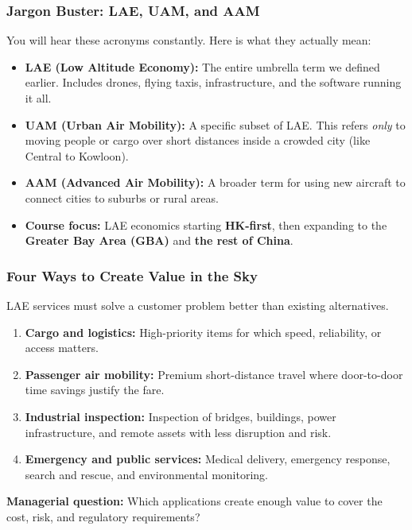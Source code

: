 \documentclass{beamer}
\begin{document}
\begin{frame}[t]
  \frametitle{Jargon Buster: LAE, UAM, and AAM}

  You will hear these acronyms constantly. Here is what they actually mean:

  \begin{itemize}
    \item \textbf{LAE (Low Altitude Economy):} The entire umbrella term we defined earlier. Includes drones, flying taxis, infrastructure, and the software running it all.
    \item \textbf{UAM (Urban Air Mobility):} A specific subset of LAE. This refers \textit{only} to moving people or cargo over short distances inside a crowded city (like Central to Kowloon).
    \item \textbf{AAM (Advanced Air Mobility):} A broader term for using new aircraft to connect cities to suburbs or rural areas.
    \item \textbf{Course focus:} LAE economics starting \textbf{HK-first}, then expanding to the \textbf{Greater Bay Area (GBA)} and \textbf{the rest of China}.
  \end{itemize}
\end{frame}

\begin{frame}[t]
  \frametitle{Four Ways to Create Value in the Sky}
  LAE services must solve a customer problem better than existing alternatives.
  \vspace{0.25cm}
  \begin{enumerate}
    \item \textbf{Cargo and logistics:} High-priority items for which speed, reliability, or access matters.
    \item \textbf{Passenger air mobility:} Premium short-distance travel where door-to-door time savings justify the fare.
    \item \textbf{Industrial inspection:} Inspection of bridges, buildings, power infrastructure, and remote assets with less disruption and risk.
    \item \textbf{Emergency and public services:} Medical delivery, emergency response, search and rescue, and environmental monitoring.
  \end{enumerate}
  \vspace{0.35cm}
  \textbf{Managerial question:} Which applications create enough value to cover the cost, risk, and regulatory requirements?
\end{frame}
\end{document}

